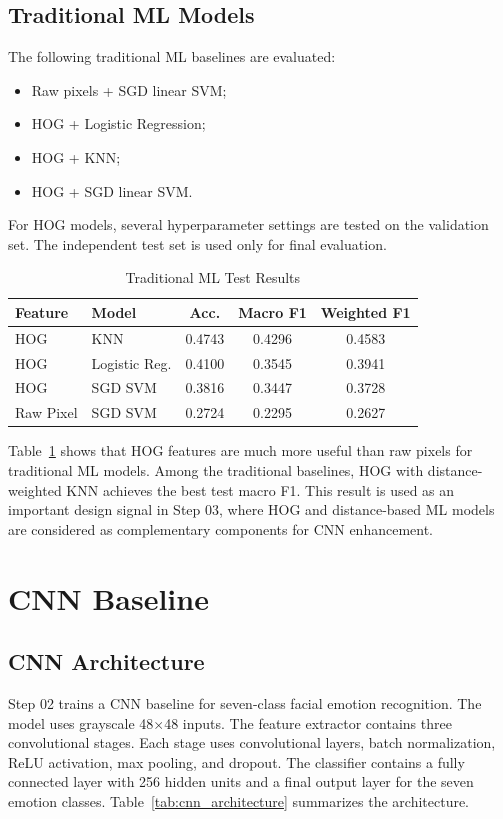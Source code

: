 \documentclass[conference]{IEEEtran}
\begin{document}
\subsection{Traditional ML Models}

The following traditional ML baselines are evaluated:
\begin{itemize}
    \item Raw pixels + SGD linear SVM;
    \item HOG + Logistic Regression;
    \item HOG + KNN;
    \item HOG + SGD linear SVM.
\end{itemize}

For HOG models, several hyperparameter settings are tested on the validation
set. The independent test set is used only for final evaluation.

\begin{table}[t]
\centering
\caption{Traditional ML Test Results}
\label{tab:step1_results}
\begin{tabular}{llccc}
\toprule
Feature & Model & Acc. & Macro F1 & Weighted F1 \\
\midrule
HOG & KNN & 0.4743 & 0.4296 & 0.4583 \\
HOG & Logistic Reg. & 0.4100 & 0.3545 & 0.3941 \\
HOG & SGD SVM & 0.3816 & 0.3447 & 0.3728 \\
Raw Pixel & SGD SVM & 0.2724 & 0.2295 & 0.2627 \\
\bottomrule
\end{tabular}
\end{table}

Table~\ref{tab:step1_results} shows that HOG features are much more useful
than raw pixels for traditional ML models. Among the traditional baselines, HOG
with distance-weighted KNN achieves the best test macro F1. This result is used
as an important design signal in Step 03, where HOG and distance-based ML
models are considered as complementary components for CNN enhancement.

\section{CNN Baseline}

\subsection{CNN Architecture}

Step 02 trains a CNN baseline for seven-class facial emotion recognition. The
model uses grayscale 48$\times$48 inputs. The feature extractor contains three
convolutional stages. Each stage uses convolutional layers, batch normalization,
ReLU activation, max pooling, and dropout. The classifier contains a fully
connected layer with 256 hidden units and a final output layer for the seven
emotion classes. Table~\ref{tab:cnn_architecture} summarizes the architecture.
\end{document}

